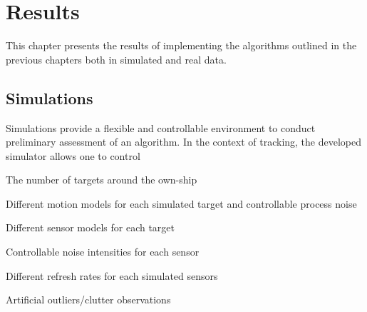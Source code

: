 \chapter{Results}
This chapter presents the results of implementing the algorithms outlined in the previous chapters both in simulated and real data.

\section{Simulations}
Simulations provide a flexible and controllable environment to conduct preliminary assessment of an algorithm. In the context of tracking, the developed simulator allows one to control 
\begin{mylist} 
	\item The number of targets around the own-ship
	\item Different motion models for each simulated target and controllable process noise 
	\item Different sensor models for each target
	\item Controllable noise intensities for each sensor
	\item Different refresh rates for each simulated sensors
	\item Artificial outliers/clutter observations
	
\end{mylist}